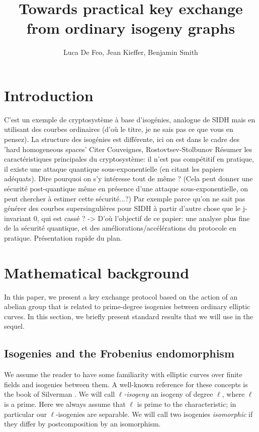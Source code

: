 \documentclass{article}
\title{Towards practical key exchange from ordinary isogeny graphs}
\author{Luca De Feo, Jean Kieffer, Benjamin Smith}
\begin{document}
\maketitle

\begin{abstract}
  
\end{abstract}

\section{Introduction}

C'est un exemple de cryptosystème à base d'isogénies, analogue de SIDH
mais en utilisant des courbes ordinaires (d'où le titre, je ne sais
pas ce que vous en pensez).  La structure des isogénies est
différente, ici on est dans le cadre des 'hard homogeneous spaces'
Citer Couveignes, Rostovtsev-Stolbunov Résumer les caractéristiques
principales du cryptosystème: il n'est pas compétitif en pratique, il
existe une attaque quantique sous-exponentielle (en citant les papiers
adéquats).  Dire pourquoi on s'y intéresse tout de même ? (Cela peut
donner une sécurité post-quantique même en présence d'une attaque
sous-exponentielle, on peut chercher à estimer cette sécurité...?) Par
exemple parce qu'on ne sait pas générer des courbes supersingulières
pour SIDH à partir d'autre chose que le j-invariant 0, qui est cassé ?
-> D'où l'objectif de ce papier: une analyse plus fine de la sécurité
quantique, et des améliorations/accélérations du protocole en
pratique.  Présentation rapide du plan.

\section{Mathematical background}

In this paper, we present a key exchange protocol based on the action of
an abelian group that is related to prime-degree isogenies between ordinary
elliptic curves. In this section, we briefly present standard results that
we will use in the sequel.

\subsection{Isogenies and the Frobenius endomorphism}


We assume the reader to have some familiarity with elliptic curves over 
finite fields and isogenies between them. A well-known reference for these 
concepts is the book of Silverman \cite{Sil1}. We will call 
\emph{$\ell$-isogeny} an isogeny of degree $\ell$, where $\ell$ is a prime.
Here we always assume that $\ell$ is prime to the characteristic;
in particular our $\ell$-isogenies are separable. We will call two isogenies
\emph{isomorphic} if they differ by postcomposition by an isomorphism.
\end{document}
